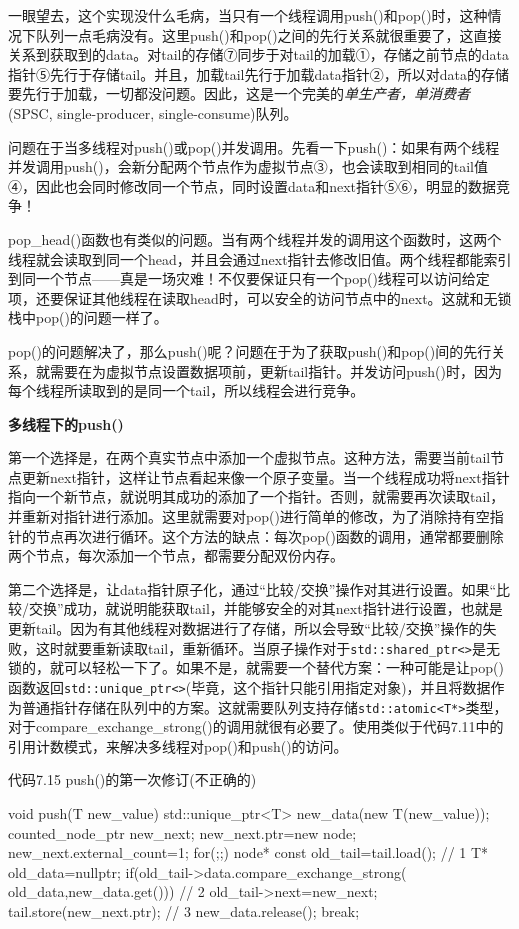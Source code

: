 一眼望去，这个实现没什么毛病，当只有一个线程调用push()和pop()时，这种情况下队列一点毛病没有。这里push()和pop()之间的先行关系就很重要了，这直接关系到获取到的data。对tail的存储⑦同步于对tail的加载①，存储之前节点的data指针⑤先行于存储tail。并且，加载tail先行于加载data指针②，所以对data的存储要先行于加载，一切都没问题。因此，这是一个完美的\textit{单生产者，单消费者}(SPSC, single-producer, single-consume)队列。

问题在于当多线程对push()或pop()并发调用。先看一下push()：如果有两个线程并发调用push()，会新分配两个节点作为虚拟节点③，也会读取到相同的tail值④，因此也会同时修改同一个节点，同时设置data和next指针⑤⑥，明显的数据竞争！

pop\_head()函数也有类似的问题。当有两个线程并发的调用这个函数时，这两个线程就会读取到同一个head，并且会通过next指针去修改旧值。两个线程都能索引到同一个节点——真是一场灾难！不仅要保证只有一个pop()线程可以访问给定项，还要保证其他线程在读取head时，可以安全的访问节点中的next。这就和无锁栈中pop()的问题一样了。

pop()的问题解决了，那么push()呢？问题在于为了获取push()和pop()间的先行关系，就需要在为虚拟节点设置数据项前，更新tail指针。并发访问push()时，因为每个线程所读取到的是同一个tail，所以线程会进行竞争。

\textbf{多线程下的push()}

第一个选择是，在两个真实节点中添加一个虚拟节点。这种方法，需要当前tail节点更新next指针，这样让节点看起来像一个原子变量。当一个线程成功将next指针指向一个新节点，就说明其成功的添加了一个指针。否则，就需要再次读取tail，并重新对指针进行添加。这里就需要对pop()进行简单的修改，为了消除持有空指针的节点再次进行循环。这个方法的缺点：每次pop()函数的调用，通常都要删除两个节点，每次添加一个节点，都需要分配双份内存。

第二个选择是，让data指针原子化，通过“比较/交换”操作对其进行设置。如果“比较/交换”成功，就说明能获取tail，并能够安全的对其next指针进行设置，也就是更新tail。因为有其他线程对数据进行了存储，所以会导致“比较/交换”操作的失败，这时就要重新读取tail，重新循环。当原子操作对于\texttt{std::shared\_ptr<>}是无锁的，就可以轻松一下了。如果不是，就需要一个替代方案：一种可能是让pop()函数返回\texttt{std::unique\_ptr<>}(毕竟，这个指针只能引用指定对象)，并且将数据作为普通指针存储在队列中的方案。这就需要队列支持存储\texttt{std::atomic<T*>}类型，对于compare\_exchange\_strong()的调用就很有必要了。使用类似于代码7.11中的引用计数模式，来解决多线程对pop()和push()的访问。

代码7.15 push()的第一次修订(不正确的)

\begin{cpp}
void push(T new_value)
{
  std::unique_ptr<T> new_data(new T(new_value));
  counted_node_ptr new_next;
  new_next.ptr=new node;
  new_next.external_count=1;
  for(;;)
  {
    node* const old_tail=tail.load();  // 1
    T* old_data=nullptr;
    if(old_tail->data.compare_exchange_strong(
      old_data,new_data.get()))  // 2
    {
      old_tail->next=new_next;
      tail.store(new_next.ptr);  // 3
      new_data.release();
      break;
    }
  }
}
\end{cpp}

